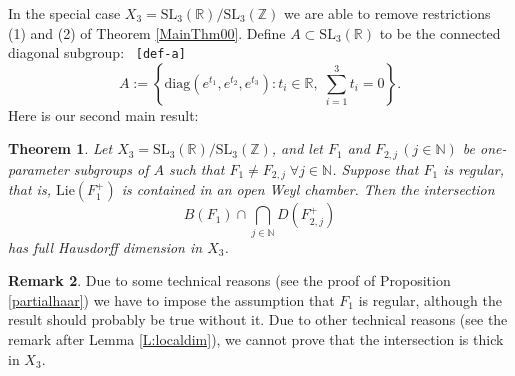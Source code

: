 \documentclass[reqno,12pt]{amsart}
\newtheorem{theorem}{Theorem}[section]
\theoremstyle{definition}
\newtheorem{remark}[theorem]{Remark}
\numberwithin{equation}{section}
\newcommand{\RR}{\mathbb{R}}
\newcommand{\NN}{\mathbb{N}}
\newcommand{\ZZ}{\mathbb{Z}}
\newcommand{\diag}{\mathrm{diag}}
\newcommand{\SL}{\mathrm{SL}}
\newcommand {\comm}[1]   {\textcolor{red}{#1}}
\newif\ifdraft\drafttrue
\newcommand\eq[2]{{\ifdraft{\ \tt [#1]}\else\ignorespaces\fi}\begin{equation}\label{eq:#1}{#2}\end{equation}}
\begin{document}

In the special case $X_3=\SL_3(\RR)/\SL_3(\ZZ)$ %
{we are able to remove restrictions (1) and (2) of Theorem \ref{MainThm00}. Define $A\subset \SL_3(\RR)$ to be the connected diagonal subgroup: 
\eq{def-a}{
A:=\left\{\diag(e^{t_1},e^{t_2},e^{t_3})
:t_i\in\RR,\;\sum_{i=1}^3t_i=0\right\}.
	}
Here is our second main result:} 



\begin{theorem}\label{MainThm1}
    Let $X_3=\SL_3(\RR)/\SL_3(\ZZ)$,  {and let} $F_1$ and $F_{2,j}\,(j\in\NN)$ be one-parameter subgroups  {of $A$} %
    such that $F_1\neq F_{2,j} \;\forall j\in\NN$. Suppose that  {$F_1$ is regular, that is,} $\mathrm{Lie}(F_1^+)$ is contained in an open Weyl chamber. Then the intersection $$
B(F_1)\cap \bigcap_{j\in\NN}D(F_{2,j}^+)    
    $$
    has full Hausdorff dimension in $X_3$.
\end{theorem}

\begin{remark} Due to some technical reasons (see the proof of Proposition \ref{partialhaar}) we have to impose the assumption that $F_1$ is regular, although the result should probably be true without it.
    Due to other technical reasons (see the remark after Lemma \ref{L:localdim}), we cannot prove that the intersection is thick in $X_3$.
\end{remark}
\end{document}
